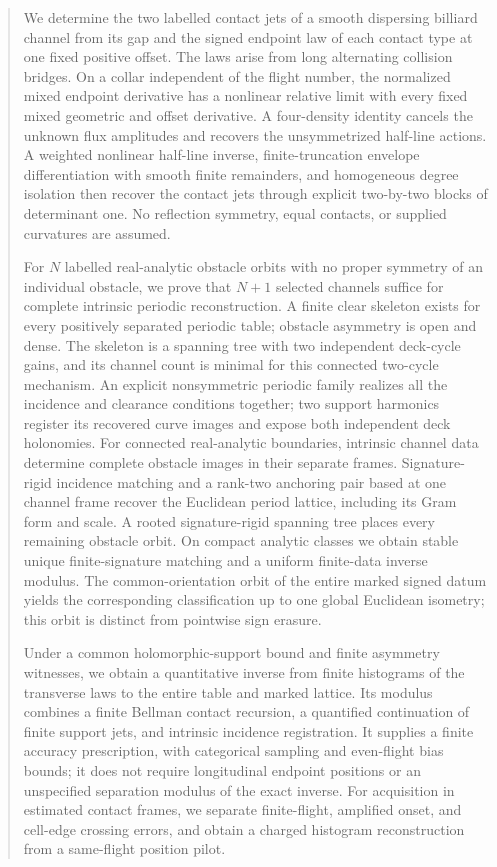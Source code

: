 \begin{abstract}
We determine the two labelled contact jets of a smooth dispersing billiard
channel from its gap and the signed endpoint law of each contact type at
one fixed positive offset.  The laws arise from long alternating collision
bridges.  On a collar independent of the flight number, the normalized
mixed endpoint derivative has a nonlinear relative limit with every fixed
mixed geometric and offset derivative.  A four-density identity cancels
the unknown flux amplitudes and recovers the unsymmetrized half-line
actions.  A weighted nonlinear half-line inverse, finite-truncation
envelope differentiation with smooth finite remainders, and homogeneous
degree isolation then recover the contact jets through explicit
two-by-two blocks of determinant one.  No reflection symmetry, equal
contacts, or supplied curvatures are assumed.

For $N$ labelled real-analytic obstacle orbits with no proper symmetry of an individual
obstacle, we prove that $N+1$ selected channels suffice for complete intrinsic
periodic reconstruction.  A finite clear skeleton exists for every
positively separated periodic table; obstacle asymmetry is open and dense.
The skeleton is a spanning tree with two independent deck-cycle gains, and
its channel count is minimal for this connected two-cycle mechanism.
An explicit nonsymmetric periodic family realizes all the incidence and
clearance conditions together; two support harmonics register its recovered
curve images and expose both independent deck holonomies.
For connected real-analytic boundaries, intrinsic channel data determine
complete obstacle images in their separate frames.  Signature-rigid incidence
matching and a rank-two anchoring pair based at one channel frame recover
the Euclidean period lattice, including its Gram form and scale.  A rooted
signature-rigid spanning tree places every remaining obstacle orbit.  On compact analytic
classes we obtain stable unique finite-signature matching and a uniform
finite-data inverse modulus.  The common-orientation orbit of the entire
marked signed datum yields the corresponding classification up to one global
Euclidean isometry; this orbit is distinct from pointwise sign erasure.

Under a common holomorphic-support bound and finite asymmetry witnesses,
we obtain a quantitative inverse from finite histograms of the transverse
laws to the entire table and marked lattice.  Its modulus combines a finite
Bellman contact recursion, a quantified continuation of finite support jets,
and intrinsic incidence registration.  It supplies a finite accuracy
prescription, with categorical sampling and even-flight bias bounds; it does
not require longitudinal endpoint positions or an unspecified separation
modulus of the exact inverse.
For acquisition in estimated contact frames, we separate finite-flight,
amplified onset, and cell-edge crossing errors, and obtain a charged
histogram reconstruction from a same-flight position pilot.


\end{abstract}
